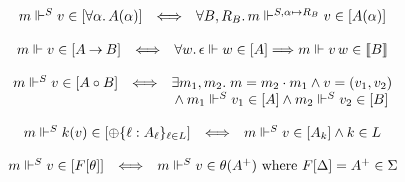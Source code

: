  
  
\par  \quad  \[\begin{array}[]{lcl}m\Vdash^{S}v\in[\forall\alpha.\,A(\alpha)]&\Longleftrightarrow&\forall B,R_{B}.\,m\Vdash^{S,\alpha\mapsto R_{B}}v\in[A(\alpha)]\end{array}\]\quad  \quad  
  
 
  
\par  \quad  \[\begin{array}[]{lcl}m\Vdash v\in[A\mathbin{\rightarrow}B]&\Longleftrightarrow&\forall w.\,\epsilon\Vdash w\in[A]\Longrightarrow m\Vdash v\,w\in\llbracket B\rrbracket\end{array}\]\quad  \quad  
  
 
  
\par  \quad  \[\begin{array}[]{lcl}m\Vdash^{S}v\in[A\mathbin{\circ}B]&\Longleftrightarrow&\exists m_{1},m_{2}.\;m=m_{2}\cdot m_{1}\land v=(v_{1},v_{2})\\
&&\hbox{}\land m_{1}\Vdash^{S}v_{1}\in[A]\land m_{2}\Vdash^{S}v_{2}\in[B]\end{array}\]\quad  \quad  
  
 
  
\par  \quad  \[\begin{array}[]{lcl}m\Vdash^{S}k(v)\in[{\oplus}\{\ell:A_{\ell}\}_{\ell\in L}]&\Longleftrightarrow&m\Vdash^{S}v\in[A_{k}]\land k\in L\end{array}\]\quad  \quad  
  
 
  
\par  \quad  \[\begin{array}[]{lcl}m\Vdash^{S}v\in[F[\theta]]&\Longleftrightarrow&m\Vdash^{S}v\in\theta(A^{+})\ \mbox{where $F[\Delta]=A^{+}\in\Sigma$}\end{array}\]\quad  \quad  
  
 
 
\par
 
 
